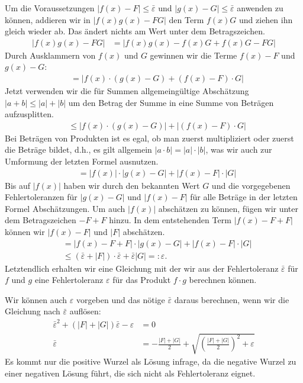 \documentclass{article}
\let\l\left\let\r\right\let\cs\csname\let\ecs\endcsname\let\ea\expandafter
\let\eps\varepsilon
\begin{document}
Um die Voraussetzungen $|f(x)-F|\leq\bar\eps$ und
$|g(x)-G|\leq\bar\eps$ anwenden zu können, addieren wir in
$|f(x)g(x)-FG|$ den Term $f(x)G$ und ziehen ihn gleich wieder ab. Das
ändert nichts am Wert unter dem Betragszeichen.
\begin{align*}
  \l|f(x) g(x) - FG\r| &= \l|f(x) g(x) - f(x)G + f(x)G - FG\r|
\end{align*}
Durch Ausklammern von $f(x)$ und $G$ gewinnen wir die Terme $f(x)-F$ und $g(x)-G$:
\begin{align*}
  &=\bigl|f(x)\cdot(g(x) - G) + (f(x)-F)\cdot G\bigr|
\end{align*}
Jetzt verwenden wir die für Summen allgemeingültige Abschätzung
$|a+b| \leq |a|+|b|$ um den Betrag der Summe in eine Summe von
Beträgen aufzusplitten.
\begin{align*}
  &\leq \l|f(x)\cdot(g(x) - G) \r| + \l|(f(x) - F)\cdot G\r|
\end{align*}
Bei Beträgen von Produkten ist es egal, ob man zuerst multipliziert
oder zuerst die Beträge bildet, d.h., es gilt allgemein
$|a\cdot b|=|a|\cdot |b|$, was wir auch zur Umformung der letzten Formel ausnutzen.
\begin{align*}
  &= |f(x)|\cdot |g(x)-G|+ \l|f(x) - F\r|\cdot|G|
\end{align*}
Bis auf $|f(x)|$ haben wir durch den bekannten Wert $G$ und die
vorgegebenen Fehlertoleranzen für $|g(x)-G|$ und $|f(x)-F|$ für alle
Beträge in der letzten Formel Abschätzungen.  Um auch $|f(x)|$
abschätzen zu können, fügen wir unter dem Betragszeichen $-F+F$
hinzu. In dem entstehenden Term $|f(x)-F+F|$ können wir $|f(x)-F|$ und
$|F|$ abschätzen.
\begin{align*}
  &= |f(x)-F+F|\cdot |g(x) - G | + |f(x)-F|\cdot |G|\\
  &\leq (\bar\eps + |F|)\cdot\bar\eps + \bar\eps |G|=:\eps.
\end{align*}
Letztendlich erhalten wir eine Gleichung mit der wir aus der
Fehlertoleranz $\bar\eps$ für $f$ und $g$ eine Fehlertoleranz $\eps$
für das Produkt $f\cdot g$ berechnen können.

Wir können auch $\eps$ vorgeben und das nötige $\bar\eps$ daraus
berechnen, wenn wir die Gleichung nach $\bar\eps$ auflösen:
\begin{align*}
  {\bar\eps}^2 + \l(|F|+|G|\r)\bar\eps -\eps &= 0\\
  \bar\eps&= -\frac{|F|+|G|}2 + \sqrt{\l(\frac{|F|+|G|}2\r)^2 + \eps}
\end{align*}
Es kommt nur die positive Wurzel als Lösung infrage, da die negative
Wurzel zu einer negativen Lösung führt, die sich nicht als
Fehlertoleranz eignet.
\end{document}
